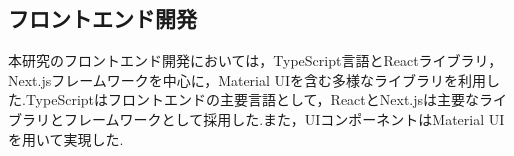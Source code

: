 \documentclass[b5paper,12pt,dvipdfmx]{jsreport}
\begin{document}


\subsection{フロントエンド開発}
本研究のフロントエンド開発においては，TypeScript言語とReactライブラリ，Next.jsフレームワークを中心に，Material UIを含む多様なライブラリを利用した.TypeScriptはフロントエンドの主要言語として，ReactとNext.jsは主要なライブラリとフレームワークとして採用した.また，UIコンポーネントはMaterial UIを用いて実現した.
\end{document}

